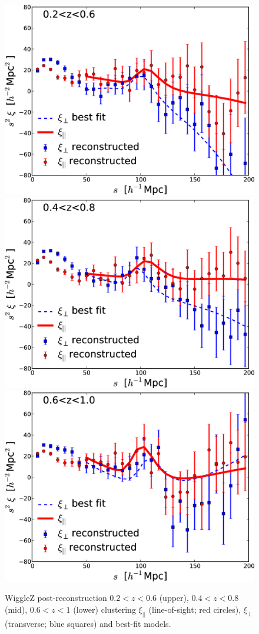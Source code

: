 \documentclass[a4paper,fleqn,usenatbib]{mnras}
\begin{document}
\begin{figure}
	\begin{center}
		\includegraphics[width=0.9\columnwidth]{WiggleZ_pre_post_rec_Xiwedges_z26.png}
		\includegraphics[width=0.9\columnwidth]{WiggleZ_pre_post_rec_Xiwedges_z48.png}
		\includegraphics[width=0.9\columnwidth]{WiggleZ_pre_post_rec_Xiwedges_z60.png}
		\caption{\label{fig:wigglez_wedges_z60}  WiggleZ post-reconstruction $0.2<z<0.6$ (upper), $0.4<z<0.8$ (mid), $0.6<z<1$ (lower) clustering $\xi_{||}$ (line-of-sight; red circles), $\xi_{\perp}$ (transverse; blue squares) and best-fit models.%
		}
	\end{center}
\end{figure}
\end{document}
